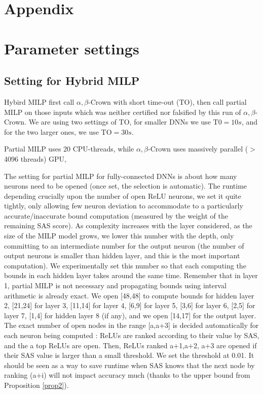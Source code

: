 \vspace{-0.6cm}

\section*{Appendix}

\section{Parameter settings}


\subsection*{Setting for Hybrid MILP}


Hybird MILP first call $\alpha,\beta$-Crown with short time-out (TO), then call partial MILP on those inputs which was neither certified nor falsified by this run of $\alpha,\beta$-Crown. We are using two settings of TO, for smaller DNNs we use T0$=10s$, and for the two larger ones, we use TO$=30s$.

Partial MILP uses 20 CPU-threads, while $\alpha,\beta$-Crown uses massively parallel ($>$4096 threads) GPU, 


The setting for partial MILP for fully-connected DNNs is about how many neurons need to be opened (once set, the selection is automatic). The runtime depending crucially upon the number of open ReLU neurons, we set it quite tightly, only allowing few neuron deviation to accommodate to a particularly accurate/inaccurate bound computation (measured by the weight of the remaining SAS score). As complexity increases with the layer considered, as the size of the MILP model grows, we lower this number with the depth, only committing to an intermediate number for the output neuron (the number of output neurons  is smaller than hidden layer, and this is the most important computation). We experimentally set this number so that each computing the bounds in each hidden layer takes around the same time. Remember that in layer 1, partial MILP is not necessary and propagating bounds using interval arithmetic is already exact. We open [48,48] to compute bounds for hidden layer 2, [21,24] for layer 3, [11,14] for layer 4, [6,9] for layer 5, [3,6] for layer 6, [2,5] for layer 7, [1,4] for hidden layer 8 (if any), and we open [14,17] for the output layer.
 The exact number of open nodes in the range [a,a+3] is decided automatically for each neuron being computed : ReLUs are ranked according to their value by SAS, and the a top ReLUs are open. Then, ReLUs ranked a+1,a+2, a+3 are opened if their SAS value is larger than a small threshold. We set the threshold at 0.01. It should be seen as a way to save runtime when SAS knows that the next node by ranking (a+i) will not impact accuracy much (thanks to the upper bound from Proposition \ref{prop2}).

